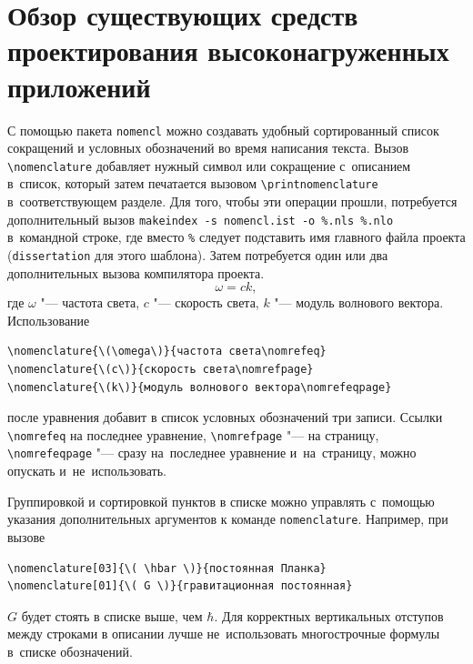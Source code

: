 \section{Обзор существующих средств проектирования высоконагруженных приложений}\label{sec:acronyms}

С помощью пакета \texttt{nomencl} можно создавать удобный сортированный список
сокращений и условных обозначений во время написания текста. Вызов
\verb+\nomenclature+ добавляет нужный символ или сокращение с~описанием
в~список, который затем печатается вызовом \verb+\printnomenclature+
в~соответствующем разделе.
Для того, чтобы эти операции прошли, потребуется дополнительный вызов
\verb+makeindex -s nomencl.ist -o %.nls %.nlo+ в~командной строке, где вместо
\verb+%+ следует подставить имя главного файла проекта (\verb+dissertation+
для этого шаблона).
Затем потребуется один или два дополнительных вызова компилятора проекта.
\begin{equation}
    \omega = c k,
\end{equation}
где \( \omega \) "--- частота света, \( c \) "--- скорость света, \( k \) "---
модуль волнового вектора.
Использование
\begin{verbatim}
\nomenclature{\(\omega\)}{частота света\nomrefeq}
\nomenclature{\(c\)}{скорость света\nomrefpage}
\nomenclature{\(k\)}{модуль волнового вектора\nomrefeqpage}
\end{verbatim}
после уравнения добавит в список условных обозначений три записи.
Ссылки \verb+\nomrefeq+ на последнее уравнение, \verb+\nomrefpage+ "--- на
страницу, \verb+\nomrefeqpage+ "--- сразу на~последнее уравнение и~на~страницу,
можно опускать и~не~использовать.

Группировкой и сортировкой пунктов в списке можно управлять с~помощью указания
дополнительных аргументов к команде \verb+nomenclature+.
Например, при вызове
\begin{verbatim}
\nomenclature[03]{\( \hbar \)}{постоянная Планка}
\nomenclature[01]{\( G \)}{гравитационная постоянная}
\end{verbatim}
\( G \) будет стоять в списке выше, чем \( \hbar \).
Для корректных вертикальных отступов между строками в описании лучше
не~использовать многострочные формулы в~списке обозначений.

